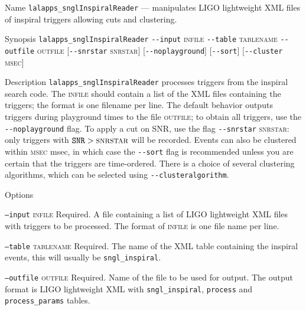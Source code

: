 \begin{entry}
\item[Name]
\verb$lalapps_snglInspiralReader$ --- manipulates LIGO lightweight XML
files of inspiral triggers allowing cuts and clustering.

\item[Synopsis]
\verb$lalapps_snglInspiralReader$ 
\verb$--input$ \textsc{infile} \verb$--table$ \textsc{tablename}
\newline 
\verb$--outfile$ \textsc{outfile}
[\verb$--snrstar$ \textsc{snrstar}] [\verb$--noplayground$] 
[\verb$--sort$] [\verb$--cluster$ \textsc{msec}] 

\item[Description] 
\verb$lalapps_snglInspiralReader$ processes triggers from the inspiral
search code.   The \textsc{infile} should contain a list of the XML
files containing the triggers;  the format is one filename per line. 
The default behavior outputs triggers during playground
times to the file \textsc{outfile};  to obtain all triggers,  use the 
\verb$--noplayground$ flag.    To apply a cut on SNR,  use the flag 
\verb$--snrstar$ \textsc{snrstar}:  only triggers with $\texttt{SNR} 
> \textsc{snrstar}$ will be recorded.    Events can also be clustered
within \textsc{msec} msec,   in which case the \verb$--sort$ flag is
recommended unless you are certain that the triggers are time-ordered.  
There is a choice of several clustering algorithms, which can be selected
using \verb$--clusteralgorithm$.


\item[Options]\leavevmode
\begin{entry}
\item[\texttt{--input} \textsc{infile}] Required.  A file containing a
list of LIGO lightweight XML files with triggers to be processed.  The
format of \textsc{infile} is one file name per line.

\item[\texttt{--table} \textsc{tablename}] Required.  The name of the 
XML table containing the inspiral events, this will usually be 
\texttt{sngl\_inspiral}.

\item[\texttt{--outfile} \textsc{outfile}] Required.  Name of the file
to be used for output.  The output format is LIGO lightweight XML with
\texttt{sngl\_inspiral}, \texttt{process} and \texttt{process\_params}
tables. 


\end{entry}
\end{entry}
